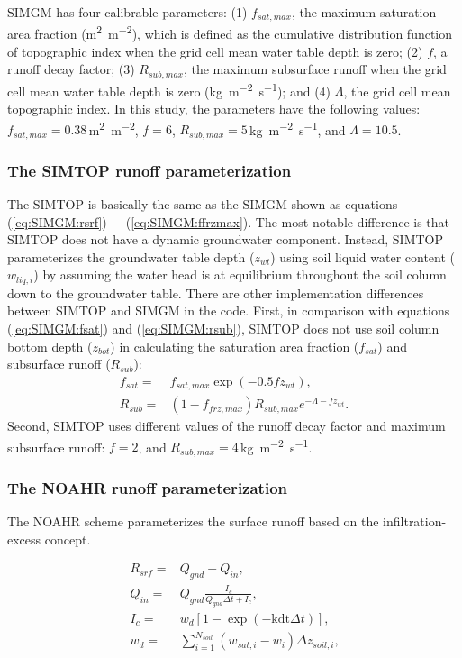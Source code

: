 \documentclass[essd]{copernicus}
\begin{document}
SIMGM has four calibrable parameters: (1) $f_{sat,max}$, the maximum saturation area fraction (\unit{m^2~m^{-2}}), which is defined as the cumulative distribution function of topographic index when the grid cell mean water table depth is zero; (2) $f$, a runoff decay factor; (3) $R_{sub,max}$, the maximum subsurface runoff when the grid cell mean water table depth is zero (\unit{kg~m^{-2}~s^{-1}}); and (4) $\Lambda$, the grid cell mean topographic index. In this study, the parameters have the following values: $f_{sat,max} = 0.38$\,\unit{m^2~m^{-2}}, $f=6$, $R_{sub,max} = 5$\,\unit{kg~m^{-2}~s^{-1}}, and $\Lambda = 10.5$.

\subsubsection{The SIMTOP runoff parameterization}

The SIMTOP is basically the same as the SIMGM shown as equations (\ref{eq:SIMGM:rsrf})~--~(\ref{eq:SIMGM:ffrzmax}). The most notable difference is that SIMTOP does not have a dynamic groundwater component. Instead, SIMTOP parameterizes the groundwater table depth ($z_{wt}$) using soil liquid water content ($w_{liq,i}$) by assuming the water head is at equilibrium throughout the soil column down to the groundwater table. There are other implementation differences between SIMTOP and SIMGM in the code. First, in comparison with equations (\ref{eq:SIMGM:fsat}) and (\ref{eq:SIMGM:rsub}), SIMTOP does not use soil column bottom depth ($z_{bot}$) in calculating the saturation area fraction ($f_{sat}$) and subsurface runoff ($R_{sub}$):
\begin{align}
    f_{sat} = & f_{sat,max} \exp(-0.5 f z_{wt}) \text{,} \\
    R_{sub} = & (1-f_{frz,max}) R_{sub,max} e^{-\Lambda-f z_{wt}} \text{.}
\end{align}
Second, SIMTOP uses different values of the runoff decay factor and maximum subsurface runoff: $f=2$, and $R_{sub,max} = 4$\,\unit{kg~m^{-2}~s^{-1}}.


\subsubsection{The NOAHR runoff parameterization}

The NOAHR scheme parameterizes the surface runoff based on the infiltration-excess concept.

\begin{align}
    R_{srf} = & Q_{gnd} - Q_{in} \text{,} \\
    Q_{in} =  & Q_{gnd} \frac{I_c}{Q_{gnd} \Delta t + I_c} \text{,} \\
    I_{c} =   & w_d [1-\exp(-\mathrm{kdt}\Delta t)] \text{,} \\
    w_d =     & \sum_{i=1}^{N_{soil}} (w_{sat,i} - w_i) \Delta z_{soil,i} \text{,}
\end{align}
\end{document}
